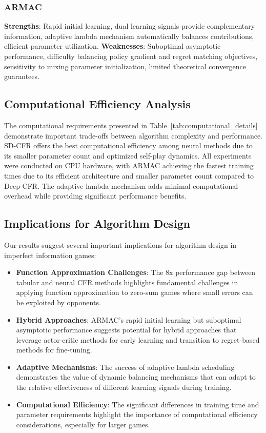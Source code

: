 \documentclass{icml2024}
\begin{document}
\subsubsection{ARMAC}
\textbf{Strengths}: Rapid initial learning, dual learning signals provide complementary information, adaptive lambda mechanism automatically balances contributions, efficient parameter utilization.
\textbf{Weaknesses}: Suboptimal asymptotic performance, difficulty balancing policy gradient and regret matching objectives, sensitivity to mixing parameter initialization, limited theoretical convergence guarantees.

\subsection{Computational Efficiency Analysis}

The computational requirements presented in Table~\ref{tab:computational_details} demonstrate important trade-offs between algorithm complexity and performance. SD-CFR offers the best computational efficiency among neural methods due to its smaller parameter count and optimized self-play dynamics. All experiments were conducted on CPU hardware, with ARMAC achieving the fastest training times due to its efficient architecture and smaller parameter count compared to Deep CFR. The adaptive lambda mechanism adds minimal computational overhead while providing significant performance benefits.

\subsection{Implications for Algorithm Design}

Our results suggest several important implications for algorithm design in imperfect information games:

\begin{itemize}
\item \textbf{Function Approximation Challenges}: The 8x performance gap between tabular and neural CFR methods highlights fundamental challenges in applying function approximation to zero-sum games where small errors can be exploited by opponents.

\item \textbf{Hybrid Approaches}: ARMAC's rapid initial learning but suboptimal asymptotic performance suggests potential for hybrid approaches that leverage actor-critic methods for early learning and transition to regret-based methods for fine-tuning.

\item \textbf{Adaptive Mechanisms}: The success of adaptive lambda scheduling demonstrates the value of dynamic balancing mechanisms that can adapt to the relative effectiveness of different learning signals during training.

\item \textbf{Computational Efficiency}: The significant differences in training time and parameter requirements highlight the importance of computational efficiency considerations, especially for larger games.
\end{itemize}
\end{document}
